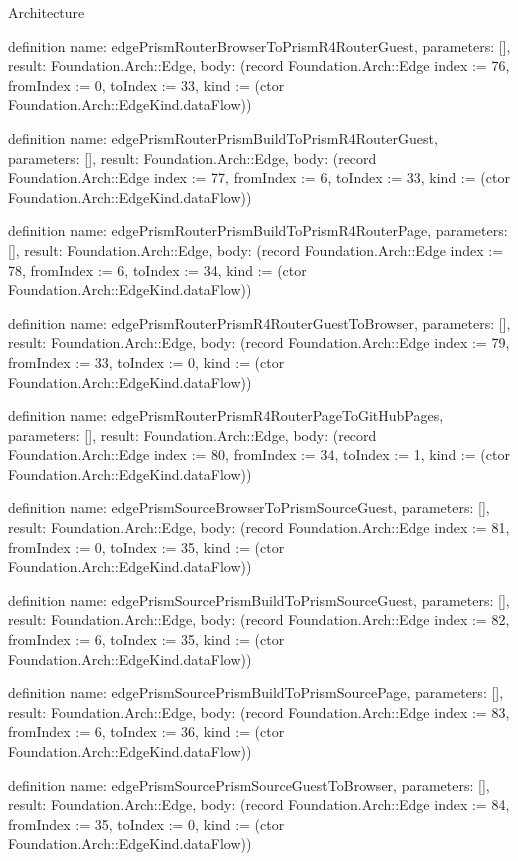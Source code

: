\begin{lexlean}{Architecture}
\begin{semanticmodule}
definition{
  name: edgePrismRouterBrowserToPrismR4RouterGuest,
  parameters: [],
  result: Foundation.Arch::Edge,
  body: (record Foundation.Arch::Edge {index := 76, fromIndex := 0, toIndex := 33, kind := (ctor Foundation.Arch::EdgeKind.dataFlow)})
}

definition{
  name: edgePrismRouterPrismBuildToPrismR4RouterGuest,
  parameters: [],
  result: Foundation.Arch::Edge,
  body: (record Foundation.Arch::Edge {index := 77, fromIndex := 6, toIndex := 33, kind := (ctor Foundation.Arch::EdgeKind.dataFlow)})
}

definition{
  name: edgePrismRouterPrismBuildToPrismR4RouterPage,
  parameters: [],
  result: Foundation.Arch::Edge,
  body: (record Foundation.Arch::Edge {index := 78, fromIndex := 6, toIndex := 34, kind := (ctor Foundation.Arch::EdgeKind.dataFlow)})
}

definition{
  name: edgePrismRouterPrismR4RouterGuestToBrowser,
  parameters: [],
  result: Foundation.Arch::Edge,
  body: (record Foundation.Arch::Edge {index := 79, fromIndex := 33, toIndex := 0, kind := (ctor Foundation.Arch::EdgeKind.dataFlow)})
}

definition{
  name: edgePrismRouterPrismR4RouterPageToGitHubPages,
  parameters: [],
  result: Foundation.Arch::Edge,
  body: (record Foundation.Arch::Edge {index := 80, fromIndex := 34, toIndex := 1, kind := (ctor Foundation.Arch::EdgeKind.dataFlow)})
}

definition{
  name: edgePrismSourceBrowserToPrismSourceGuest,
  parameters: [],
  result: Foundation.Arch::Edge,
  body: (record Foundation.Arch::Edge {index := 81, fromIndex := 0, toIndex := 35, kind := (ctor Foundation.Arch::EdgeKind.dataFlow)})
}

definition{
  name: edgePrismSourcePrismBuildToPrismSourceGuest,
  parameters: [],
  result: Foundation.Arch::Edge,
  body: (record Foundation.Arch::Edge {index := 82, fromIndex := 6, toIndex := 35, kind := (ctor Foundation.Arch::EdgeKind.dataFlow)})
}

definition{
  name: edgePrismSourcePrismBuildToPrismSourcePage,
  parameters: [],
  result: Foundation.Arch::Edge,
  body: (record Foundation.Arch::Edge {index := 83, fromIndex := 6, toIndex := 36, kind := (ctor Foundation.Arch::EdgeKind.dataFlow)})
}

definition{
  name: edgePrismSourcePrismSourceGuestToBrowser,
  parameters: [],
  result: Foundation.Arch::Edge,
  body: (record Foundation.Arch::Edge {index := 84, fromIndex := 35, toIndex := 0, kind := (ctor Foundation.Arch::EdgeKind.dataFlow)})
}


\end{semanticmodule}
\end{lexlean}
